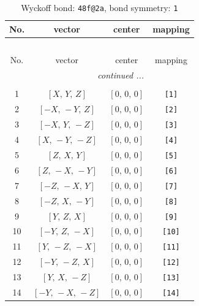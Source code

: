 \documentclass[fleqn,8pt]{jsarticle}
\begin{document}
\begin{longtable}{cccc}
\caption{Wyckoff bond: {\tt 48f@2a}, bond symmetry: {\tt 1}}
 \\
 \hline \hline
No. & vector & center & mapping \\ \hline \endfirsthead

\multicolumn{3}{l}{\tablename\ \thetable{}} \\
 \hline \hline
No. & vector & center & mapping \\ \hline \endhead

 \hline \hline
\multicolumn{3}{r}{\footnotesize\it continued ...} \\ \endfoot

 \hline \hline
\multicolumn{3}{r}{} \\ \endlastfoot

1 & $\left[ X,\, Y,\, Z \right]$ & $\left[ 0,\, 0,\, 0 \right]$ & {\tt [1]} \\ \hline
2 & $\left[ - X,\, - Y,\, Z \right]$ & $\left[ 0,\, 0,\, 0 \right]$ & {\tt [2]} \\ \hline
3 & $\left[ - X,\, Y,\, - Z \right]$ & $\left[ 0,\, 0,\, 0 \right]$ & {\tt [3]} \\ \hline
4 & $\left[ X,\, - Y,\, - Z \right]$ & $\left[ 0,\, 0,\, 0 \right]$ & {\tt [4]} \\ \hline
5 & $\left[ Z,\, X,\, Y \right]$ & $\left[ 0,\, 0,\, 0 \right]$ & {\tt [5]} \\ \hline
6 & $\left[ Z,\, - X,\, - Y \right]$ & $\left[ 0,\, 0,\, 0 \right]$ & {\tt [6]} \\ \hline
7 & $\left[ - Z,\, - X,\, Y \right]$ & $\left[ 0,\, 0,\, 0 \right]$ & {\tt [7]} \\ \hline
8 & $\left[ - Z,\, X,\, - Y \right]$ & $\left[ 0,\, 0,\, 0 \right]$ & {\tt [8]} \\ \hline
9 & $\left[ Y,\, Z,\, X \right]$ & $\left[ 0,\, 0,\, 0 \right]$ & {\tt [9]} \\ \hline
10 & $\left[ - Y,\, Z,\, - X \right]$ & $\left[ 0,\, 0,\, 0 \right]$ & {\tt [10]} \\ \hline
11 & $\left[ Y,\, - Z,\, - X \right]$ & $\left[ 0,\, 0,\, 0 \right]$ & {\tt [11]} \\ \hline
12 & $\left[ - Y,\, - Z,\, X \right]$ & $\left[ 0,\, 0,\, 0 \right]$ & {\tt [12]} \\ \hline
13 & $\left[ Y,\, X,\, - Z \right]$ & $\left[ 0,\, 0,\, 0 \right]$ & {\tt [13]} \\ \hline
14 & $\left[ - Y,\, - X,\, - Z \right]$ & $\left[ 0,\, 0,\, 0 \right]$ & {\tt [14]} \\ \hline

\end{longtable}
\end{document}
